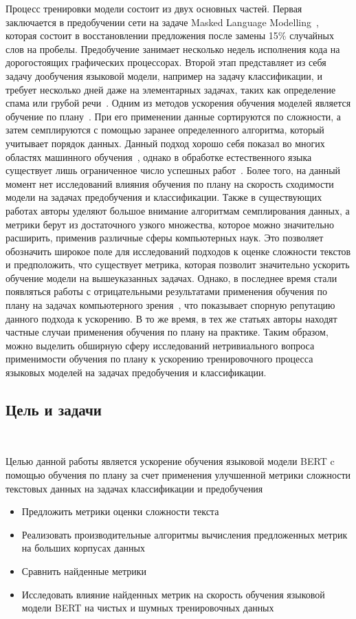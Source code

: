 \documentclass{spbau-diploma}
\begin{document}
Процесс тренировки модели состоит из двух основных частей. Первая заключается в предобучении сети на задаче Masked Language Modelling~\cite{devlin2018bert}, которая состоит в восстановлении предложения после замены 15\% случайных слов на пробелы. Предобучение занимает несколько недель исполнения кода на дорогостоящих графических процессорах. Второй этап представляет из себя задачу дообучения языковой модели, например на задачу классификации, и требует несколько дней даже на элементарных задачах, таких как определение спама или грубой речи~\cite{gertner2019mitre}. Одним из методов ускорения обучения моделей является обучение по плану~\cite{bengio2009curriculum}. При его применении данные сортируются по сложности, а затем семплируются с помощью заранее определенного алгоритма, который учитывает порядок данных. Данный подход хорошо себя показал во многих областях машинного обучения~\cite{narvekar2020curriculum, hacohen2019power, mermer2017scalable}, однако в обработке естественного языка существует лишь ограниченное число успешных работ~\cite{platanios2019competence, xu2020curriculum}. Более того, на данный момент нет исследований влияния обучения по плану на скорость сходимости модели на задачах предобучения и классификации. Также в существующих работах авторы уделяют большое внимание алгоритмам семплирования данных, а метрики берут из достаточного узкого множества, которое можно значительно расширить, применив различные сферы компьютерных наук. Это позволяет обозначить широкое поле для исследований подходов к оценке сложности текстов и предположить, что существует метрика, которая позволит значительно ускорить обучение модели на вышеуказанных задачах. Однако, в последнее время стали появляться работы с отрицательными результатами применения обучения по плану на задачах компьютерного зрения~\cite{wu2020curricula}, что показывает спорную репутацию данного подхода к ускорению. В то же время, в тех же статьях авторы находят частные случаи применения обучения по плану на практике. Таким образом, можно выделить обширную сферу исследований нетривиального вопроса применимости обучения по плану к ускорению тренировочного процесса языковых моделей на задачах предобучения и классификации.

\subsection*{Цель и задачи}
\ 

Целью данной работы является ускорение обучения языковой модели BERT c помощью обучения по плану за счет применения улучшенной метрики сложности текстовых данных на задачах классификации и предобучения
\begin{itemize}
	\item Предложить метрики оценки сложности текста
	\item Реализовать производительные алгоритмы вычисления предложенных метрик на больших корпусах данных
	\item Сравнить найденные метрики
	\item Исследовать влияние найденных метрик на скорость обучения языковой модели BERT на чистых и шумных тренировочных данных
\end{itemize}
\end{document}
